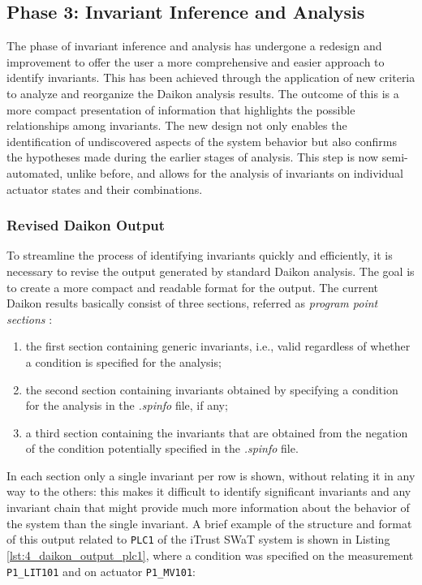 \subsection{Phase 3: Invariant Inference and Analysis}
\label{subsec:4_improve_invariants}
The phase of invariant inference and analysis has undergone a redesign and improvement to offer the user a more comprehensive and easier approach to identify invariants. This has been achieved through the application of new criteria to analyze and reorganize the Daikon analysis results. The outcome of this is a more compact presentation of information that highlights the possible relationships among invariants.\newline
The new design not only enables the identification of undiscovered aspects of the system behavior but also confirms the hypotheses made during the earlier stages of analysis. This step is now semi-automated, unlike before, and allows for the analysis of invariants on individual actuator states and their combinations.

\subsubsection{Revised Daikon Output}
\label{subsub:4_new_daikon_output}
To streamline the process of identifying invariants quickly and efficiently, it is necessary to revise the output generated by standard Daikon analysis. The goal is to create a more compact and readable format for the output.
\newline \newline
The current Daikon results basically consist of three sections, referred as \textit{program point sections} \cite{daikon_program_point}:

\begin{enumerate}
	\item the first section containing generic invariants, i.e., valid regardless of whether a condition is specified for the analysis;
	
	\item the second section containing invariants obtained by specifying a condition for the analysis in the \textit{.spinfo} file, if any;
	
	\item a third section containing the invariants that are obtained from the negation of the condition potentially specified in the \textit{.spinfo} file.
\end{enumerate}

In each section only a single invariant per row is shown, without relating it in any way to the others: this makes it difficult to identify significant invariants and any invariant chain that might provide much more information about the behavior of the system than the single invariant.\newline
A brief example of the structure and format of this output related to \texttt{PLC1} of the iTrust SWaT system is shown in Listing \ref{lst:4_daikon_output_plc1}, where a condition was specified on the measurement \texttt{P1\_LIT101} and on actuator \texttt{P1\_MV101}: %


